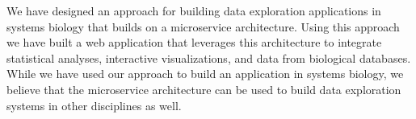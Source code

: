
We have designed an approach for building data exploration applications in
systems biology that builds on a microservice architecture. Using this approach
we have built a web application that leverages this architecture to integrate
statistical analyses, interactive visualizations, and data from biological
databases. While we have used our approach to build an application in systems
biology, we believe that the microservice architecture can be used to build data
exploration systems in other disciplines as well. 

